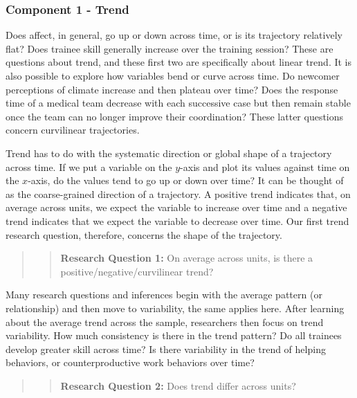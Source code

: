 \documentclass[english,,man]{apa6}
\theoremstyle{definition}
\theoremstyle{definition}
\theoremstyle{definition}
\theoremstyle{remark}
\begin{document}
\hypertarget{component-1---trend}{%
\subsubsection{Component 1 - Trend}\label{component-1---trend}}

Does affect, in general, go up or down across time, or is its trajectory
relatively flat? Does trainee skill generally increase over the training
session? These are questions about trend, and these first two are
specifically about linear trend. It is also possible to explore how
variables bend or curve across time. Do newcomer perceptions of climate
increase and then plateau over time? Does the response time of a medical
team decrease with each successive case but then remain stable once the
team can no longer improve their coordination? These latter questions
concern curvilinear trajectories.

Trend has to do with the systematic direction or global shape of a
trajectory across time. If we put a variable on the \(y\)-axis and plot
its values against time on the \(x\)-axis, do the values tend to go up
or down over time? It can be thought of as the coarse-grained direction
of a trajectory. A positive trend indicates that, on average across
units, we expect the variable to increase over time and a negative trend
indicates that we expect the variable to decrease over time. Our first
trend research question, therefore, concerns the shape of the
trajectory.

\begin{quote}
\begin{quote}
\textbf{Research Question 1:} On average across units, is there a
positive/negative/curvilinear trend?
\end{quote}
\end{quote}

Many research questions and inferences begin with the average pattern
(or relationship) and then move to variability, the same applies here.
After learning about the average trend across the sample, researchers
then focus on trend variability. How much consistency is there in the
trend pattern? Do all trainees develop greater skill across time? Is
there variability in the trend of helping behaviors, or
counterproductive work behaviors over time?

\begin{quote}
\begin{quote}
\textbf{Research Question 2:} Does trend differ across units?
\end{quote}
\end{quote}
\end{document}
